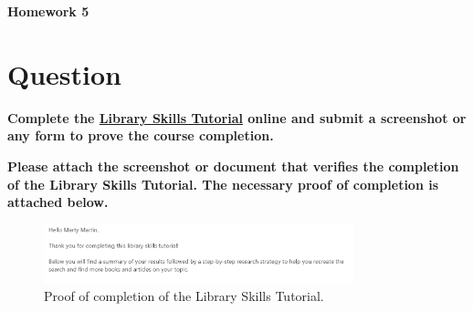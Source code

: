 \documentclass[12pt]{article}
\begin{document}
\begin{center}
  \Large \textbf{Homework 5}
\end{center}

\section*{Question}
\textbf{Complete the \href{URL_HERE}{Library Skills Tutorial} online and submit a screenshot or any form to prove the course completion.}

\textbf{Please attach the screenshot or document that verifies the completion of the Library Skills Tutorial. The necessary proof of completion is attached below.}

\begin{figure}[h!]
  \centering
  \includegraphics[width=0.8\textwidth]{Library_Tutorial.png}
  \caption{Proof of completion of the Library Skills Tutorial.}
\end{figure}
\end{document}
